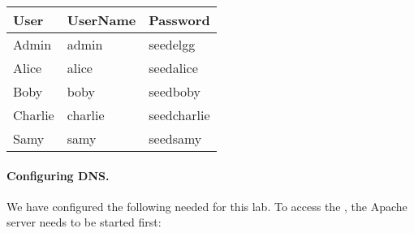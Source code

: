 \vspace{0.1in}
\begin{tabular}{|l|l|l|}
\hline
User 	& UserName 	& Password\\
\hline
Admin 	& admin 	& seedelgg \\
Alice 	& alice 	& seedalice \\
Boby 	& boby 		& seedboby \\
Charlie & charlie 	& seedcharlie \\
Samy 	& samy 		& seedsamy \\
\hline
\end{tabular}
\vspace{0.1in}


\paragraph{Configuring DNS.}
We have configured the following \urlorurls needed for this lab. To access 
the \urlorurls, the Apache server needs to be started first:
